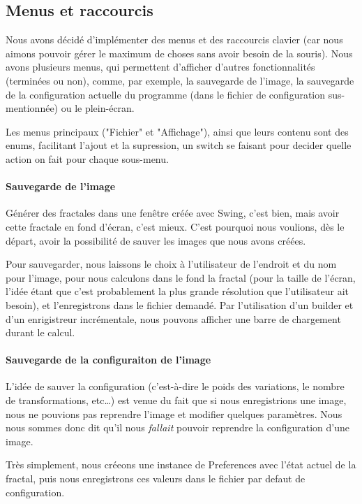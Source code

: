 \documentclass[a4paper]{article}
\begin{document}
\subsection*{Menus et raccourcis}
Nous avons décidé d'implémenter des menus et des raccourcis clavier (car nous aimons pouvoir gérer le maximum de choses sans avoir besoin de la souris). Nous avons plusieurs menus, qui permettent d'afficher d'autres fonctionnalités (terminées ou non), comme, par exemple, la sauvegarde de l'image, la sauvegarde de la configuration actuelle du programme (dans le fichier de configuration sus-mentionnée) ou le plein-écran.

Les menus principaux ("Fichier" et "Affichage"), ainsi que leurs contenu sont des enums, facilitant l'ajout et la supression, un switch se faisant pour decider quelle action on fait pour chaque sous-menu.

\paragraph{Sauvegarde de l'image}
Générer des fractales dans une fenêtre créée avec Swing, c'est bien, mais avoir cette fractale en fond d'écran, c'est mieux. C'est pourquoi nous voulions, dès le départ, avoir la possibilité de sauver les images que nous avons créées.

Pour sauvegarder, nous laissons le choix à l'utilisateur de l'endroit et du nom pour l'image, pour nous calculons dans le fond la fractal (pour la taille de l'écran, l'idée étant que c'est probablement la plus grande résolution que l'utilisateur ait besoin), et l'enregistrons dans le fichier demandé. Par l'utilisation d'un builder et d'un enrigistreur incrémentale, nous pouvons afficher une barre de chargement durant le calcul.

\paragraph{Sauvegarde de la configuraiton de l'image}
L'idée de sauver la configuration (c'est-à-dire le poids des variations, le nombre de transformations, etc\ldots) est venue du fait que si nous enregistrions une image, nous ne pouvions pas reprendre l'image et modifier quelques paramètres. Nous nous sommes donc dit qu'il nous \textit{fallait} pouvoir reprendre la configuration d'une image.

Très simplement, nous créeons une instance de Preferences avec l'état actuel de la fractal, puis nous enregistrons ces valeurs dans le fichier par defaut de configuration.
\end{document}
